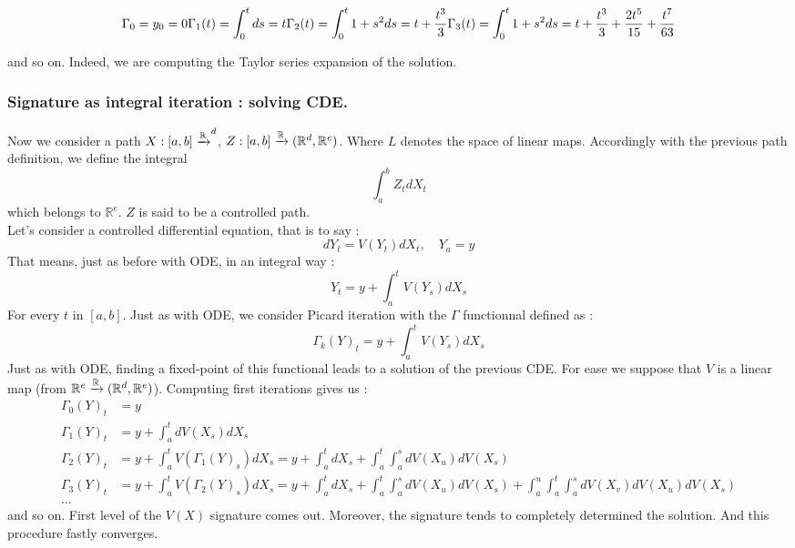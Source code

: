 \documentclass[10pt,a4paper]{article}
\begin{document}
\[
\Gamma_{0} = y_0 = 0 \\
\Gamma_{1}(t) = \int_{0}^{t} ds = t \\
\Gamma_{2}(t) = \int_{0}^{t} 1 + s^2 ds = t + \frac{t^3}{3}\\
\Gamma_{3}(t) = \int_{0}^{t} 1 + s^2 ds = t + \frac{t^3}{3} + \frac{2t^5}{15} + \frac{t^7}{63}\\
\]

and so on.
Indeed, we are computing the Taylor series expansion of the solution.\\
\subsubsection{Signature as integral iteration : solving CDE.}

 Now we consider a path $X : [a, b] \xrightarrow {\mathbb{R}}^d$, $Z : [a,b] \xrightarrow {\mathbb{R}} (\mathbb{R}^d , \mathbb{R}^e )$. Where $L$ denotes the space of linear maps. Accordingly with the previous path definition, we define the integral
 $$\int_a ^b Z_t dX_t$$
 which belongs to $\mathbb{R}^e$. $Z$ is said to be a controlled path. \\
 Let's consider a controlled differential equation, that is to say :
 $$dY_t = V(Y_t ) dX_t, \quad Y_a = y$$
 That means, just as before with ODE, in an integral way :
 $$Y_t = y + \int_a ^t V(Y_s ) dX_s$$
 For every $t$ in $[a,b]$.
 Just as with ODE, we consider Picard iteration with the $\Gamma$ functionnal defined as :
 $$\Gamma_{k}(Y)_t = y + \int_a ^t V(Y_s)dX_s$$
 Just as with ODE, finding a fixed-point of this functional leads to a solution of the previous CDE.
 For ease we suppose that $V$ is a linear map (from $\mathbb{R}^e \xrightarrow {\mathbb{R}}(\mathbb{R}^d , \mathbb{R}^e )$). Computing first iterations gives us :
 \begin{align*}
 \Gamma_{0}(Y)_t &= y \\
 \Gamma_{1}(Y)_t &= y + \int_a ^t dV(X_s)dX_s \\
 \Gamma_{2}(Y)_t &= y + \int_a ^t V(\Gamma_{1}(Y)_s )dX_s = y + \int_a ^t dX_s + \int_a ^t\int_a ^s dV(X_u)dV(X_s)  \\
 \Gamma_{3}(Y)_t &= y + \int_a ^t V(\Gamma_{2}(Y)_s )dX_s =  y + \int_a ^t dX_s + \int_a ^t\int_a ^s dV(X_u)dV(X_s) +  \int_a ^u\int_a ^t \int_a ^s dV(X_v)dV(X_u)dV(X_s) \\
 \ldots
 \end{align*}
and so on.
First level of the $V(X)$ signature comes out. Moreover, the signature tends to completely determined the solution. And this procedure fastly converges.\\
\end{document}
